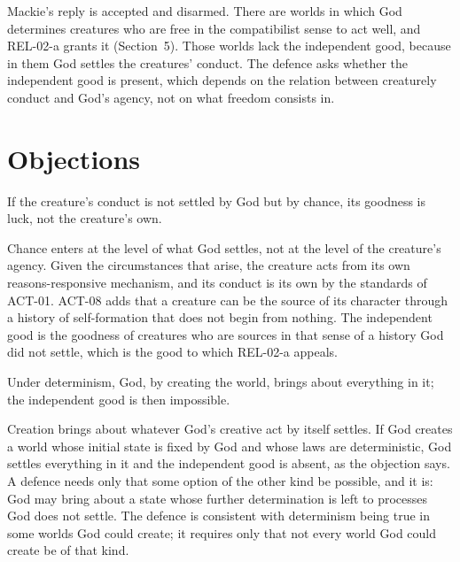 \documentclass{situationist-preprint}
\begin{document}
Mackie's reply is accepted and disarmed. There are worlds in which God determines creatures who are free in the compatibilist sense to act well, and REL-02-a grants it (Section~5). Those worlds lack the independent good, because in them God settles the creatures' conduct. The defence asks whether the independent good is present, which depends on the relation between creaturely conduct and God's agency, not on what freedom consists in.

\section{Objections}

\begin{objection}
If the creature's conduct is not settled by God but by chance, its goodness is luck, not the creature's own.
\end{objection}

\begin{reply}
Chance enters at the level of what God settles, not at the level of the creature's agency. Given the circumstances that arise, the creature acts from its own reasons-responsive mechanism, and its conduct is its own by the standards of ACT-01. ACT-08 adds that a creature can be the source of its character through a history of self-formation that does not begin from nothing. The independent good is the goodness of creatures who are sources in that sense of a history God did not settle, which is the good to which REL-02-a appeals.
\end{reply}

\begin{objection}
Under determinism, God, by creating the world, brings about everything in it; the independent good is then impossible.
\end{objection}

\begin{reply}
Creation brings about whatever God's creative act by itself settles. If God creates a world whose initial state is fixed by God and whose laws are deterministic, God settles everything in it and the independent good is absent, as the objection says. A defence needs only that some option of the other kind be possible, and it is: God may bring about a state whose further determination is left to processes God does not settle. The defence is consistent with determinism being true in some worlds God could create; it requires only that not every world God could create be of that kind.
\end{reply}
\end{document}
